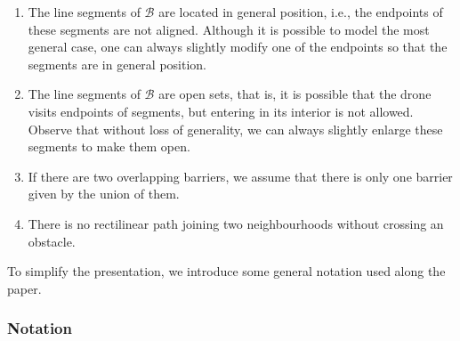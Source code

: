 \documentclass[a4paper,  review, authoryear, 1p.]{elsarticle}
\newcommand{\SPPN}{{\sf{H-SPPN}\xspace }}
\begin{document}
		\begin{enumerate}[label=\textbf{A\arabic*},ref=\textbf{A\arabic*}]
			\item \label{A1}The line segments of $\mathcal B$ are located in general position, i.e., the endpoints of these segments are not aligned. Although it is possible to model the most general case, one can always  slightly modify one of the endpoints so that the segments are in general position.
			\item The line segments of $\mathcal B$ are open sets, that is, it is possible that the drone visits  endpoints of segments, but entering  in its interior is not allowed. Observe that without loss of generality, we can always slightly enlarge these segments to make them open.
			\item  If there are two overlapping barriers, we assume that there is only one barrier given by the union of them.
			\item \label{A4}There is no rectilinear path joining two neighbourhoods without crossing an obstacle.
		\end{enumerate}
		
		
		To simplify the presentation, we introduce some general notation used along the paper.
		\subsubsection*{Notation} 
		
\end{document}
